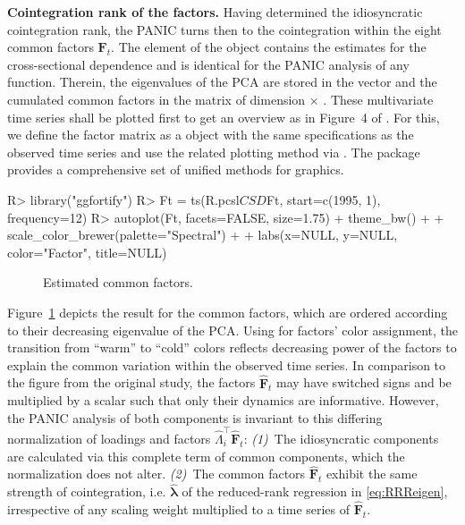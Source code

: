\textbf{Cointegration rank of the factors.} Having determined the idiosyncratic cointegration rank, the PANIC turns then to the cointegration within the eight common factors $ \boldsymbol{F}_{t} $. The  element of the  object contains the estimates for the cross-sectional dependence and is identical for the PANIC analysis of any  function. Therein, the eigenvalues of the PCA are stored in the vector  and the cumulated common factors in the matrix  of dimension  $ \times $ . These multivariate time series shall be plotted first to get an overview as in Figure~4 of \citet[p.~71]{OersalArsova2017}. For this, we define the factor matrix  as a  object with the same specifications as the observed time series and use the related plotting method via . The package  \citep{TangEtAl2016} provides a comprehensive set of unified methods for  graphics.
\begin{CodeChunk}
\begin{CodeInput}
R> library("ggfortify")
R> Ft = ts(R.pcsl$CSD$Ft, start=c(1995, 1), frequency=12)
R> autoplot(Ft, facets=FALSE, size=1.75) + theme_bw() + 
+     scale_color_brewer(palette="Spectral") +
+     labs(x=NULL, y=NULL, color="Factor", title=NULL)
\end{CodeInput}
\end{CodeChunk}
\begin{figure}[ht] %
	\centering
	\caption{Estimated common factors.}
	\resizebox{0.8\textwidth}{!}{
		}
	\label{fig:Factors}
\end{figure}
Figure~\ref{fig:Factors} depicts the  result for the common factors, which are ordered according to their decreasing eigenvalue of the PCA. Using  for factors' color assignment, the transition from ``warm'' to ``cold'' colors reflects decreasing power of the factors to explain the common variation within the observed time series. In comparison to the figure from the original study, the factors $ \boldsymbol{\hat{F}}_t $ may have switched signs and be multiplied by a scalar such that only their dynamics are informative. However, the PANIC analysis of both components is invariant to this differing normalization of loadings and factors $ \hat{\Lambda}_i^\top \boldsymbol{\hat{F}}_t $: \textit{(1)}~The idiosyncratic components are calculated via this complete term of common components, which the normalization does not alter. \textit{(2)}~The common factors $ \boldsymbol{\hat{F}}_{t} $ exhibit the same strength of cointegration, i.e. $ \boldsymbol{\hat{\lambda}} $ of the reduced-rank regression in \eqref{eq:RRReigen}, irrespective of any scaling weight multiplied to a time series of $ \boldsymbol{\hat{F}}_{t} $.

